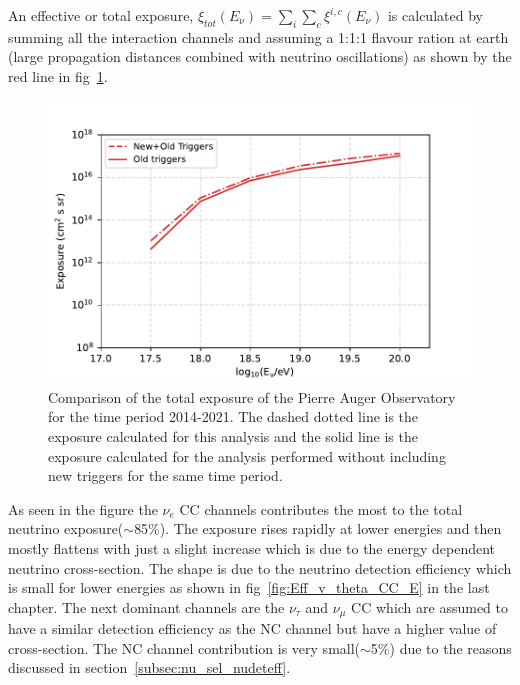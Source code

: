An effective or total exposure, $\xi_{tot}(E_{\nu}) = \sum_{i}\sum_{c} \xi^{i,c}(E_{\nu})$ is calculated by summing all the interaction channels and assuming a 1:1:1 flavour ration at earth (large propagation distances combined with neutrino oscillations) as shown by the red line in fig~\ref{fig:Exp_total_comp}. 

\begin{figure}[t!]
  \centering
  \includegraphics[width=14.5cm]{thesis_figures/ExpLimits/Exposure_comp_total_new_sim_optim.pdf}
  \caption{Comparison of the total exposure of the Pierre Auger Observatory for the time period 2014-2021. The dashed dotted line is the exposure calculated for this analysis and the solid line is the exposure calculated for the analysis performed without including new triggers for the same time period.}
  \label{fig:Exp_total_comp}
\end{figure}

As seen in the figure the $\nu_e$ CC channels contributes the most to the total neutrino exposure($\sim$85\%). The exposure rises rapidly at lower energies and then mostly flattens with just a slight increase which is due to the energy dependent neutrino cross-section. The shape is due to the neutrino detection efficiency which is small for lower energies as shown in fig~\ref{fig:Eff_v_theta_CC_E} in the last chapter. The next dominant channels are the $\nu_{\tau}$ and $\nu_{\mu}$ CC which are assumed to have a similar detection efficiency as the NC channel but have a higher value of cross-section. The NC channel contribution is very small($\sim$5\%) due to the reasons discussed in section~\ref{subsec:nu_sel_nudeteff}.  

